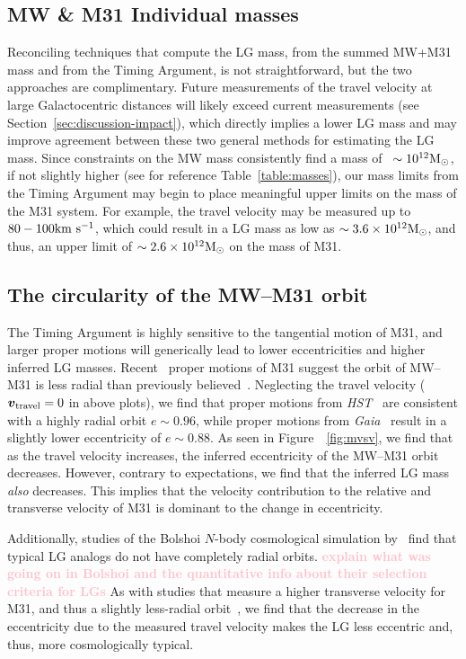 \documentclass[twocolumn]{aastex631}
\newcommand{\kc}[1]{\textcolor{pink}{\textbf{#1}} }
\newcommand{\bov}{\ensuremath{\boldsymbol{v}}}
\newcommand{\vtrav}{\ensuremath{\bov_{\rm travel}}}
\begin{document}
\subsection{MW \& M31 Individual masses}
Reconciling techniques that compute the LG mass, from the summed MW+M31 mass and
from the Timing Argument, is not straightforward, but the two approaches
are complimentary.
Future measurements of the travel velocity at large Galactocentric distances
will likely exceed current measurements (see
Section~\ref{sec:discussion-impact}), which
directly implies a lower LG mass and may improve agreement between these two
general methods for estimating the LG mass.
Since constraints on the MW mass consistently find a mass of
~$\sim10^{12}\mathrm{M}_\odot$, if not slightly higher (see for reference
Table~\ref{table:masses}), our mass limits from the Timing Argument may begin to
place meaningful upper limits on the mass of the M31 system.
For example, the travel velocity may be measured up to $80-100\mathrm{km}~\mathrm{s}^{-1}$, which could
result in a LG mass as low as $\sim3.6\times10^{12}\mathrm{M}_\odot$, and thus, an upper
limit of $\sim2.6\times10^{12}\mathrm{M}_\odot$ on the mass of M31.


\subsection{The circularity of the MW--M31 orbit}
The Timing Argument is highly sensitive to the tangential motion of M31, and
larger proper motions will generically lead to lower eccentricities and higher
inferred LG masses.
Recent \gaia\ proper motions of M31 suggest the orbit of MW--M31 is less radial
than previously believed~\citep{vdm2019,Salomon2021}.
Neglecting the travel velocity ($\vtrav=0$ in above plots), we find that proper
motions from \textit{HST}~\citep{vdm2012} are consistent with a highly radial
orbit $e\sim0.96$, while proper motions from \textit{Gaia}~\citep{Salomon2021}
result in a slightly lower eccentricity of $e\sim0.88$.
As seen in Figure~~\ref{fig:mvsv}, we find that as the travel velocity
increases, the inferred eccentricity of the MW--M31 orbit decreases.
However, contrary to expectations, we find that the inferred LG mass
\textit{also} decreases.
This implies that the velocity contribution to the relative and transverse
velocity of M31 is dominant to the change in eccentricity.

Additionally, studies of the Bolshoi $N$-body cosmological simulation
by~\cite{Forero-Romero2013} find that typical LG analogs do not have completely
radial orbits. \kc{explain what was going on in Bolshoi and the quantitative info about their selection criteria for LGs}
As with studies that measure a higher transverse velocity for M31, and thus a
slightly less-radial orbit~\citep{vdm2019,Salomon2021}, we find that the
decrease in the eccentricity due to the measured travel velocity makes the LG
less eccentric and, thus, more cosmologically typical.
\end{document}
